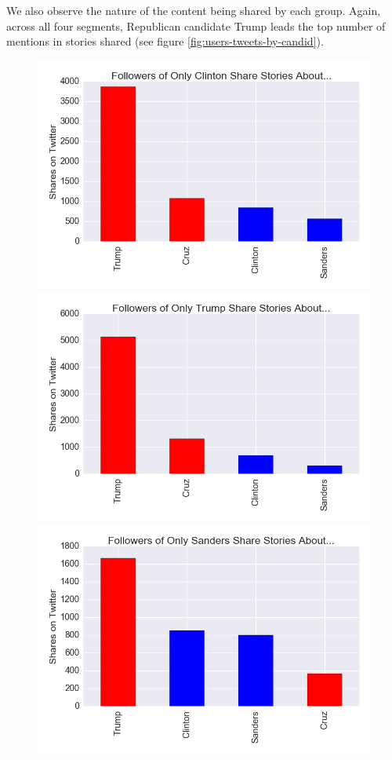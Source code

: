 \documentclass[letterpaper]{article}
\begin{document}
We also observe the nature of the content being shared by each group. Again, across all four segments, Republican candidate Trump leads the top number of mentions in stories shared (see figure \ref{fig:users-tweets-by-candid}).
 

\begin{figure}[htbp!] 
\centering 
 \includegraphics[width=0.9\columnwidth]{clinton-camp-shares}
 \includegraphics[width=0.9\columnwidth]{trump-camp-shares}  
 \includegraphics[width=0.9\columnwidth]{sanders-camp-shares}  

\end{figure}
\end{document}
